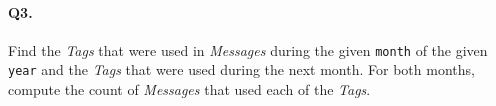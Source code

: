 \paragraph{Q3.}
Find the \emph{Tags} that were used in \emph{Messages} during the given
\texttt{month} of the given \texttt{year} and the \emph{Tags} that were
used during the next month.
For both months, compute the count of \emph{Messages} that used each of
the \emph{Tags}.

